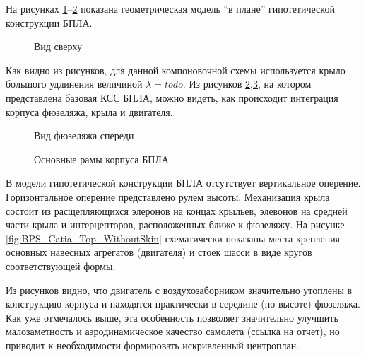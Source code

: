 На рисунках 
\ref{fig:BPS_Catia_Top}--\ref{fig:BPS_Catia_Front} показана геометрическая модель ``в плане'' гипотетической конструкции БПЛА.


\begin{figure}[H]
\centering
\def\svgwidth{0.9\textwidth}

\caption{Вид сверху}
\label{fig:BPS_Catia_Top}
\end{figure}

Как видно из рисунков, для данной компоновочной схемы используется крыло большого удлинения величиной $\lambda = todo$. Из рисунков \ref{fig:BPS_Catia_Front},\ref{fig:BPS_Catia_WithoutSkin}, на котором представлена базовая КСС БПЛА, можно видеть, как происходит интеграция корпуса фюзеляжа, крыла и двигателя. 

\begin{figure}[H]
\centering

\caption{Вид фюзеляжа спереди}
\label{fig:BPS_Catia_Front}
\end{figure}


\begin{figure}[H]
\centering
\def\svgwidth{0.9\textwidth}

\caption{Основные рамы корпуса БПЛА}
\label{fig:BPS_Catia_WithoutSkin}
\end{figure}

В модели гипотетической конструкции БПЛА отсутствует вертикальное оперение. Горизонтальное оперение представлено рулем высоты. Механизация крыла состоит из расщепляющихся элеронов на концах крыльев, элевонов на средней части крыла и интерцепторов, расположенных ближе к фюзеляжу. На рисунке \ref{fig:BPS_Catia_Top_WithoutSkin} схематически показаны места крепления основных навесных агрегатов (двигателя) и стоек шасси в виде кругов соответствующей формы. 

Из рисунков видно, что двигатель с воздухозаборником значительно утоплены в конструкцию корпуса и находятся практически в середине (по высоте) фюзеляжа. Как уже отмечалось выше, эта особенность позволяет значительно улучшить малозаметность и аэродинамическое качество самолета (ссылка на отчет), но приводит к необходимости формировать искривленный центроплан. 

